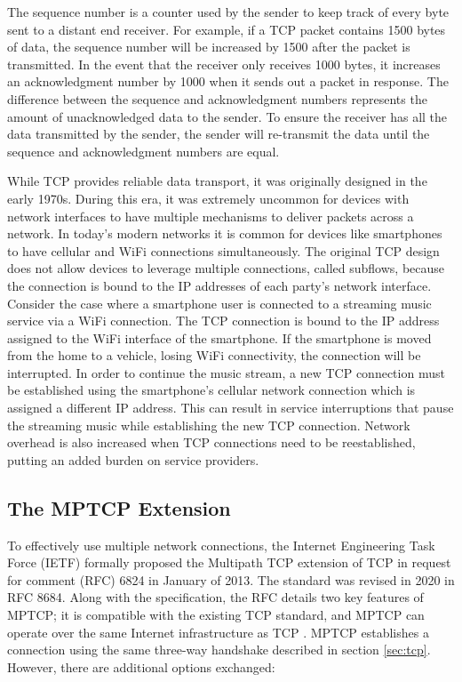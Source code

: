 \documentclass[sigplan,screen,nonacm]{acmart}
\begin{document}
The sequence number is a counter used by the sender to keep track of every byte sent to a distant end receiver. For example, if a TCP packet contains 1500 bytes of data, the sequence number will be increased by 1500 after the packet is transmitted. In the event that the receiver only receives 1000 bytes, it increases an acknowledgment number by 1000 when it sends out a packet in response. The difference between the sequence and acknowledgment numbers represents the amount of unacknowledged data to the sender. To ensure the receiver has all the data transmitted by the sender, the sender will re-transmit the data until the sequence and acknowledgment numbers are equal. 

While TCP provides reliable data transport, it was originally designed in the early 1970s. During this era, it was extremely uncommon for devices with network interfaces to have multiple mechanisms to deliver packets across a network. In today’s modern networks it is common for devices like smartphones to have cellular and WiFi connections simultaneously. The original TCP design does not allow devices to leverage multiple connections, called subflows, because the connection is bound to the IP addresses of each party's network interface. \cite{MPTCPoverview:2012} Consider the case where a smartphone user is connected to a streaming music service via a WiFi connection. The TCP connection is bound to the IP address assigned to the WiFi interface of the smartphone. If the smartphone is moved from the home to a vehicle, losing WiFi connectivity, the connection will be interrupted. In order to continue the music stream, a new TCP connection must be established using the smartphone’s cellular network connection which is assigned a different IP address. This can result in service interruptions that pause the streaming music while establishing the new TCP connection. Network overhead is also increased when TCP connections need to be reestablished, putting an added burden on service providers.

\subsection{The MPTCP Extension}
\label{sec:mptcp}

To effectively use multiple network connections, the Internet Engineering Task Force (IETF) formally proposed the Multipath TCP extension of TCP in request for comment (RFC) 6824 in January of 2013. The standard was revised in 2020 in RFC 8684. Along with the specification, the RFC details two key features of MPTCP; it is compatible with the existing TCP standard, and MPTCP can operate over the same Internet infrastructure as TCP \cite{MPTCPoverview:2012}. MPTCP establishes a connection using the same three-way handshake described in section \ref{sec:tcp}. However, there are additional options exchanged:
\end{document}
